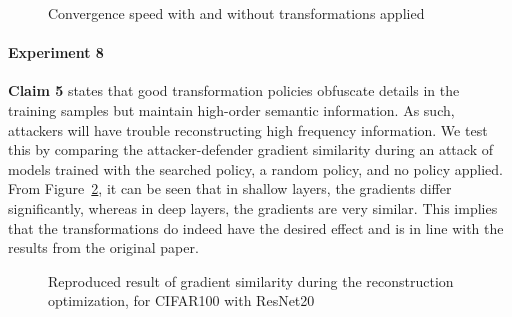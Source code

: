 \begin{figure}[H]
    \centering
    
    \caption{Convergence speed with and without transformations applied}
    \label{fig:3}
\end{figure}
\paragraph{Experiment 8}

\textbf{Claim 5} states that good transformation policies obfuscate details in the training samples but maintain high-order semantic information. As such, attackers will have trouble reconstructing high frequency information. We test this by comparing the attacker-defender gradient similarity during an attack of models trained with the searched policy, a random policy, and no policy applied. From Figure~\ref{fig:6}, it can be seen that in shallow layers, the gradients differ significantly, whereas in deep layers, the gradients are very similar. This implies that the transformations do indeed have the desired effect and is in line with the results from the original paper.

\begin{figure}[htb]
    \centering
    

    \caption{Reproduced result of gradient similarity during the reconstruction optimization, for CIFAR100 with ResNet20}
    \label{fig:6}
    \vspace{-5mm}
\end{figure}

